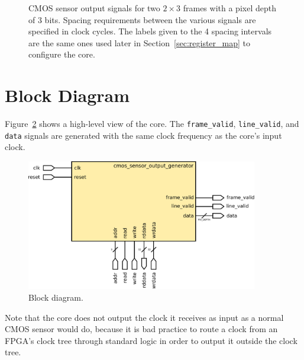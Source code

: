 \documentclass{article}
\begin{document}
\begin{figure}[h]
    \centering
    \caption{CMOS sensor output signals for two $2\times3$ frames with a pixel depth of 3 bits. Spacing requirements between the various signals are specified in clock cycles. The labels given to the 4 spacing intervals are the same ones used later in Section~\ref{sec:register_map} to configure the core.}
    \label{fig:cmos_sensor_signals_waveform}
\end{figure}

\section{Block Diagram}
Figure~\ref{fig:cmos_sensor_output_generator_external} shows a high-level view of the core.
The \texttt{frame\_valid}, \texttt{line\_valid}, and \texttt{data} signals are generated with the same clock frequency as the core's input clock.

\begin{figure}[h]
    \centering
    \includegraphics[width=0.9\textwidth]{fig/cmos_sensor_output_generator_external}
    \caption{Block diagram.}
    \label{fig:cmos_sensor_output_generator_external}
\end{figure}

Note that the core does not output the clock it receives as input as a normal CMOS sensor would do, because it is bad practice to route a clock from an FPGA's clock tree through standard logic in order to output it outside the clock tree.
\end{document}

